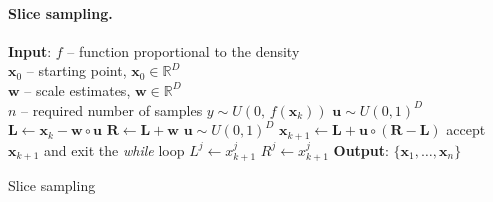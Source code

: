 \documentclass{itatnew}
\newcommand{\xx}{\mathrm{\mathbf{x}}}
\begin{document}
\paragraph{Slice sampling.}

\begin{algorithm}[b]
\begin{algorithmic}[1]
{\small
\STATE \textbf{Input}: $f$ -- function proportional to the density \\
  \quad $\xx_0$ -- starting point, $\xx_0 \in \mathbb{R}^D$ \\
  \quad $\mathbf{w}$ -- scale estimates, $\mathbf{w} \in \mathbb{R}^D$ \\
  \quad $n$ -- required number of samples
  \STATE $y \sim U(0, \, f(\xx_k))$  \hspace{\fill}  
  \STATE $\mathbf{u} \sim U(0,1)^D$ %
  \STATE $\mathbf{L} \leftarrow \xx_k - \mathbf{w} \circ \mathbf{u}$  \hspace{\fill}   %
  \STATE $\mathbf{R} \leftarrow \mathbf{L} + \mathbf{w}$   \hspace{\fill}  
    \STATE $\mathbf{u} \sim U(0,1)^D$
    \STATE $\xx_{k+1} \leftarrow \mathbf{L} + \mathbf{u} \circ (\mathbf{R} - \mathbf{L})$ \hspace{\fill}  \COMMENT{$\xx_{k+1} \sim U(\mathbf{L},\mathbf{R})^D$}
    \IF {$(y < f(\xx_{k+1}))$}
      \STATE accept $\xx_{k+1}$ and exit the \emph{while} loop
    \ENDIF
      \STATE $L^j \leftarrow x^j_{k+1}$  \hspace{\fill}  
      \ELSE
      \STATE $R^j \leftarrow x^j_{k+1}$  \hspace{\fill}  
      \ENDIF
    \ENDFOR
  \ENDWHILE
\ENDFOR
\STATE \textbf{Output}: $\{\xx_1,\ldots,\xx_n\}$
}
\end{algorithmic}
\caption{Slice sampling~\cite{neal_slice_2003}}
\label{alg:slice}
\end{algorithm}
\end{document}
